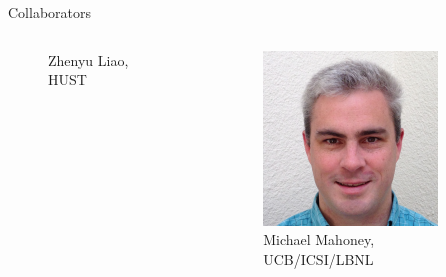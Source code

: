 \begin{frame}{Collaborators}
\begin{columns}[c]
\begin{column}{0.24\textwidth}
\begin{figure}
        \caption{\tiny Zhenyu Liao,\\ HUST}
    \end{figure}
    \end{column}
    \begin{column}{0.24\textwidth}
    \begin{figure}
        \centering
        \includegraphics[width=\textwidth]{Figures/intro/mmahoney.png}
        \caption{\tiny Michael Mahoney,\\ UCB/ICSI/LBNL}
    \end{figure}
    \end{column}
    \end{columns}
\end{frame}

